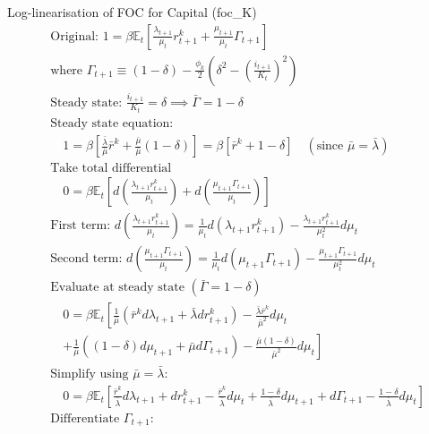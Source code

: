 \documentclass[11pt,preprint]{elsarticle}
\numberwithin{equation}{section}
\numberwithin{figure}{section}
\numberwithin{table}{section}
\begin{document}
Log-linearisation of FOC for Capital (foc\_K) \begin{align*}
& \text{Original: } 1 = \beta \mathbb{E}_t \left[ \frac{\lambda_{t+1}}{\mu_t} r^k_{t+1} + \frac{\mu_{t+1}}{\mu_t} \Gamma_{t+1} \right] \\[4pt]
& \text{where } \Gamma_{t+1} \equiv (1-\delta) - \frac{\phi_k}{2} \left( \delta^2 - \left( \frac{i_{t+1}}{K_t} \right)^2 \right) \\[6pt]
& \text{Steady state: } \frac{i_{t+1}}{K_t} = \delta \implies \bar{\Gamma} = 1 - \delta \\[6pt]
& \text{Steady state equation:} \\
& \quad 1 = \beta \left[ \frac{\bar{\lambda}}{\bar{\mu}} \bar{r}^k + \frac{\bar{\mu}}{\bar{\mu}} (1-\delta) \right] = \beta \left[ \bar{r}^k + 1 - \delta \right] \quad (\text{since } \bar{\mu}=\bar{\lambda}) \\[6pt]
& \text{Take total differential} \\
& \quad 0 = \beta \mathbb{E}_t \left[ d\left( \frac{\lambda_{t+1} r^k_{t+1}}{\mu_t} \right) + d\left( \frac{\mu_{t+1} \Gamma_{t+1}}{\mu_t} \right) \right] \\[6pt]
& \text{First term: } d\left( \frac{\lambda_{t+1} r^k_{t+1}}{\mu_t} \right) = \frac{1}{\mu_t} d(\lambda_{t+1} r^k_{t+1}) - \frac{\lambda_{t+1} r^k_{t+1}}{\mu_t^2} d\mu_t \\[6pt]
& \text{Second term: } d\left( \frac{\mu_{t+1} \Gamma_{t+1}}{\mu_t} \right) = \frac{1}{\mu_t} d(\mu_{t+1} \Gamma_{t+1}) - \frac{\mu_{t+1} \Gamma_{t+1}}{\mu_t^2} d\mu_t \\[6pt]
& \text{Evaluate at steady state } (\bar{\Gamma}=1-\delta) \\[6pt]
& \quad 0 = \beta \mathbb{E}_t \left[ \frac{1}{\bar{\mu}} (\bar{r}^k d\lambda_{t+1} + \bar{\lambda} dr^k_{t+1}) - \frac{\bar{\lambda} \bar{r}^k}{\bar{\mu}^2} d\mu_t \right. \\
& \quad \left. + \frac{1}{\bar{\mu}} \left( (1-\delta) d\mu_{t+1} + \bar{\mu} d\Gamma_{t+1} \right) - \frac{\bar{\mu} (1-\delta)}{\bar{\mu}^2} d\mu_t \right] \\[6pt]
& \text{Simplify using } \bar{\mu}=\bar{\lambda}: \\
& \quad 0 = \beta \mathbb{E}_t \left[ \frac{\bar{r}^k}{\bar{\lambda}} d\lambda_{t+1} + dr^k_{t+1} - \frac{\bar{r}^k}{\bar{\lambda}} d\mu_t + \frac{1-\delta}{\bar{\lambda}} d\mu_{t+1} + d\Gamma_{t+1} - \frac{1-\delta}{\bar{\lambda}} d\mu_t \right] \\[6pt]
& \text{Differentiate } \Gamma_{t+1}: \\

\end{align*}
\end{document}

